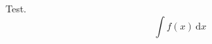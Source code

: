 \documentclass[12pt, a4paper]{article}
\title{\doctitle}
\author{\authors}
\date{\today}
\theoremstyle{empty}
\newcommand{\1}{\mathds{1}}
\renewcommand{\d}{\,\mathrm{d}}
\begin{document}
Test.
\[ \int f(x) \d x \]
\end{document}
